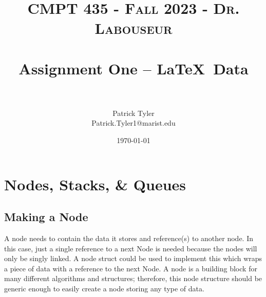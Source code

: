 \documentclass[letterpaper, 10pt]{article}
\title{	
   \normalfont \normalsize 
   \textsc{CMPT 435 - Fall 2023 - Dr. Labouseur} \\[10pt] %
   \horrule{0.5pt} \\[0.25cm] 	%
   \huge Assignment One -- \LaTeX ~Data\\     	    %
   \horrule{0.5pt} \\[0.25cm] 	%
}
\author{Patrick Tyler \\ \normalsize Patrick.Tyler1@marist.edu}
\date{\normalsize\today} 	%
\begin{document}
\maketitle %


\section{Nodes, Stacks, \& Queues}
\subsection{Making a Node}
A node needs to contain the data it stores and reference(s) to another node.
In this case, just a single reference to a next Node is needed because the nodes will only be singly linked.
A node struct could be used to implement this which wraps a piece of data with a reference to the next Node.
A node is a building block for many different algorithms and structures; 
therefore, this node structure should be generic enough to easily create a node storing any type of data.

\end{document}
